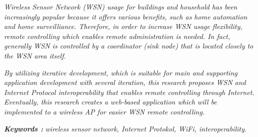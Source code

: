 \documentclass{jtetiskripsi}
\begin{document}
\begin{abstracteng}
\emph{
Wireless Sensor Network (WSN) usage for buildings and household has been increasingly popular because it offers various benefits, such as home automation and home surveilliance. Therefore, in order to increase WSN usage flexibility, remote controlling which enables remote administration is needed. In fact, generally WSN is controlled by a coordinator (sink node) that is located closely to the WSN area itself.}

\emph{By utilizing iterative development, which is suitable for main and supporting application development with several iteration, this research proposes WSN and Internet Protocol interoperability that enables remote controlling through Internet. Eventually, this research creates a web-based application which will be implemented to a wireless AP for easier WSN remote controlling.}

\bigskip
\noindent
\textbf{\emph{Keywords :}} \emph{wireless sensor network, Internet Protokol, WiFi, interoperability}.
\end{abstracteng}














\end{document}
